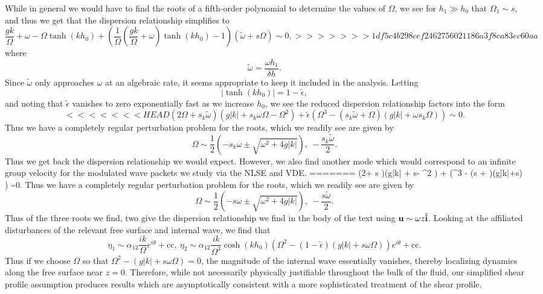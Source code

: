 \documentclass[a4paper,11pt]{article}
\begin{document}
While in general we would have to find the roots of a fifth-order polynomial to determine the values of $\Omega$, we see for $h_{1}\gg h_{0}$ that $\Omega_{1}\sim s$, and thus we get that the dispersion relationship simplifies to 
\[
\frac{gk}{\Omega} + \omega -\Omega \tanh(kh_{0}) + \left(\frac{1}{\Omega}\left(\frac{gk}{\Omega} + \omega\right)\tanh(kh_{0}) - 1\right)\left(\tilde{\omega} + s\Omega \right) \sim 0,
>>>>>>> 1df5c4b298ccf2462756021186a3f8ca83ec60aa
\]
where 
\[
\tilde{\omega} = \frac{\omega h_{1}}{\delta h}.
\]
Since $\tilde{\omega}$ only approaches $\omega$ at an algebraic rate, it seems appropriate to keep it included in the analysis.  Letting 
\[
\left|\tanh(kh_{0}) \right| = 1 - \tilde{\epsilon}, 
\]
and noting that $\tilde{\epsilon}$ vanishes to zero exponentially fast as we increase $h_{0}$, we see the reduced dispersion relationship factors into the form
\[
<<<<<<< HEAD
\left(2\Omega + s_{k}\tilde{\omega} \right)\left(g\left|k\right| + s_{k}\omega \Omega - \Omega^{2} \right) + \tilde{\epsilon}\left(\Omega^{3} - (s_{k}\tilde{\omega} + \Omega)(g|k|+\omega s_{k}\Omega) \right) \sim 0.
\]
Thus we have a completely regular perturbation problem for the roots, which we readily see are given by
\[
\Omega \sim \frac{1}{2}\left(-s_{k}\omega \pm \sqrt{\omega^{2}+4g|k|} \right), ~ -\frac{s_{k}\tilde{\omega}}{2}.
\]
Thus we get back the dispersion relationship we would expect.  However, we also find another mode which would correspond to an infinite group velocity for the modulated wave packets we study via the NLSE and VDE.   
=======
\left(2\Omega + s\tilde{\omega} \right)\left(g\left|k\right| + s\omega \Omega - \Omega^{2} \right) + \tilde{\epsilon}\left(\Omega^{3} - (s\tilde{\omega} + \Omega)(g|k|+\omega s\Omega) \right) \sim 0.
\]
Thus we have a completely regular perturbation problem for the roots, which we readily see are given by
\[
\Omega \sim \frac{1}{2}\left(-s\omega \pm \sqrt{\omega^{2}+4g|k|} \right), ~ -\frac{s\tilde{\omega}}{2}.
\]
Thus of the three roots we find, two give the dispersion relationship we find in the body of the text using ${\bf u}\sim \omega z \hat{{\bf i}}$.  Looking at the affiliated disturbances of the relevant free surface and internal wave, we find that  
\[
\eta_{1} \sim \alpha_{12}\frac{ik}{\Omega}e^{i\theta} + \mbox{cc}, ~ \eta_{2} \sim \alpha_{12}\frac{ik}{\Omega^{3}}\cosh(kh_{0})\left(\Omega^{2}-(1-\tilde{\epsilon})\left( g|k|+s\omega\Omega\right)\right)e^{i\theta}+ \mbox{cc}.
\]
Thus if we choose $\Omega$ so that $\Omega^{2}-\left( g|k|+s\omega\Omega\right)= 0$, the magnitude of the internal wave essentially vanishes, thereby localizing dynamics along the free surface near $z=0$.  Therefore, while not necessarily physically justifiable throughout the bulk of the fluid, our simplified shear profile assumption produces results which are asymptotically consistent with a more sophisticated treatment of the shear profile.  
\end{document}
